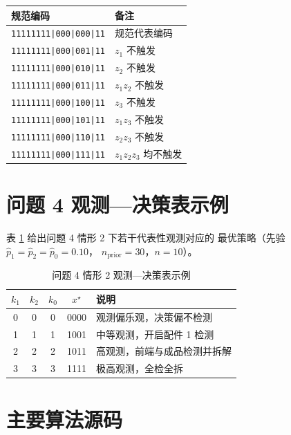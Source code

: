 \documentclass[withoutpreface,bwprint]{cumcmthesis}
\begin{document}
\begin{appendices}
\begin{table}[htbp]
\centering
\small
\begin{tabular}{ll}
\toprule[1.5pt]
\textbf{规范编码} & \textbf{备注} \\
\midrule[1pt]
\texttt{11111111|000|000|11} & 规范代表编码 \\
\texttt{11111111|000|001|11} & $z_1$ 不触发 \\
\texttt{11111111|000|010|11} & $z_2$ 不触发 \\
\texttt{11111111|000|011|11} & $z_1 z_2$ 不触发 \\
\texttt{11111111|000|100|11} & $z_3$ 不触发 \\
\texttt{11111111|000|101|11} & $z_1 z_3$ 不触发 \\
\texttt{11111111|000|110|11} & $z_2 z_3$ 不触发 \\
\texttt{11111111|000|111|11} & $z_1 z_2 z_3$ 均不触发 \\
\bottomrule[1.5pt]
\end{tabular}
\end{table}

\section{问题 4 观测—决策表示例}
\label{app:q4-table}

表 \ref{app:tab-q4} 给出问题 4 情形 2 下若干代表性观测对应的
最优策略（先验 $\hat p_1 = \hat p_2 = \hat p_0 = 0.10$，
$n_{\mathrm{prior}} = 30$，$n = 10$）。

\begin{table}[htbp]
\centering
\caption{问题 4 情形 2 观测—决策表示例}
\label{app:tab-q4}
\small
\begin{tabular}{ccccl}
\toprule[1.5pt]
$k_1$ & $k_2$ & $k_0$ & $x^\star$ & 说明 \\
\midrule[1pt]
0 & 0 & 0 & 0000 & 观测偏乐观，决策偏不检测 \\
1 & 1 & 1 & 1001 & 中等观测，开启配件 1 检测 \\
2 & 2 & 2 & 1011 & 高观测，前端与成品检测并拆解 \\
3 & 3 & 3 & 1111 & 极高观测，全检全拆 \\
\bottomrule[1.5pt]
\end{tabular}
\end{table}

\section{主要算法源码}


\end{appendices}
\end{document}
